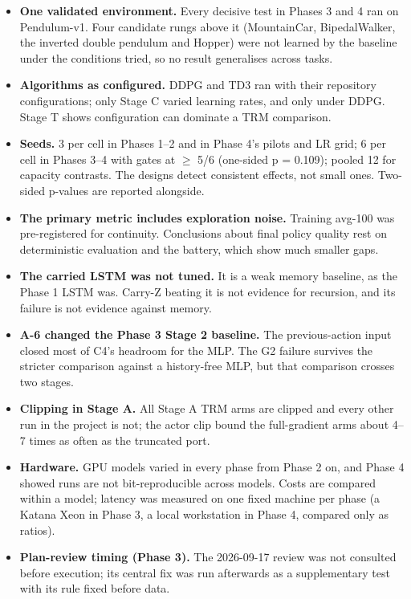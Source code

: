 \documentclass[11pt]{article}
\begin{document}
\begin{itemize}
\item \textbf{One validated environment.} Every decisive test in Phases 3 and 4 ran on Pendulum-v1. Four candidate rungs above it (MountainCar, BipedalWalker, the inverted double pendulum and Hopper) were not learned by the baseline under the conditions tried, so no result generalises across tasks.
\item \textbf{Algorithms as configured.} DDPG and TD3 ran with their repository configurations; only Stage C varied learning rates, and only under DDPG. Stage T shows configuration can dominate a TRM comparison.
\item \textbf{Seeds.} 3 per cell in Phases 1--2 and in Phase 4's pilots and LR grid; 6 per cell in Phases 3--4 with gates at $\geq$ 5/6 (one-sided p = 0.109); pooled 12 for capacity contrasts. The designs detect consistent effects, not small ones. Two-sided p-values are reported alongside.
\item \textbf{The primary metric includes exploration noise.} Training avg-100 was pre-registered for continuity. Conclusions about final policy quality rest on deterministic evaluation and the battery, which show much smaller gaps.
\item \textbf{The carried LSTM was not tuned.} It is a weak memory baseline, as the Phase 1 LSTM was. Carry-Z beating it is not evidence for recursion, and its failure is not evidence against memory.
\item \textbf{A-6 changed the Phase 3 Stage 2 baseline.} The previous-action input closed most of C4's headroom for the MLP. The G2 failure survives the stricter comparison against a history-free MLP, but that comparison crosses two stages.
\item \textbf{Clipping in Stage A.} All Stage A TRM arms are clipped and every other run in the project is not; the actor clip bound the full-gradient arms about 4--7 times as often as the truncated port.
\item \textbf{Hardware.} GPU models varied in every phase from Phase 2 on, and Phase 4 showed runs are not bit-reproducible across models. Costs are compared within a model; latency was measured on one fixed machine per phase (a Katana Xeon in Phase 3, a local workstation in Phase 4, compared only as ratios).
\item \textbf{Plan-review timing (Phase 3).} The 2026-09-17 review was not consulted before execution; its central fix was run afterwards as a supplementary test with its rule fixed before data.

\end{itemize}
\end{document}
